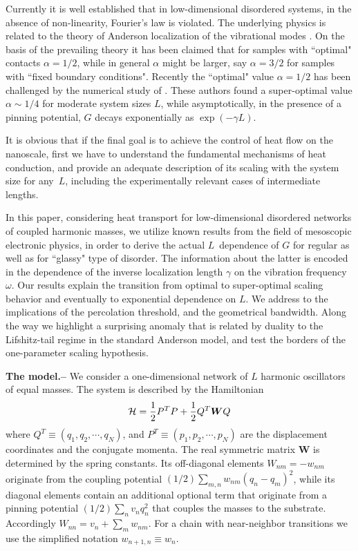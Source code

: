 \documentclass[twocolumn,showpacs,aps,pre]{revtex4-1}
\newcommand{\sect}[1]{{\bf #1.-- }}
\begin{document}
Currently it is well established that in low-dimensional disordered systems, in the absence of non-linearity, Fourier's law  is violated. The
underlying physics is related to the theory of Anderson localization of the vibrational modes \cite{D08,D01,LXXZL12,DL08,LD05,RD08,LZH01,
KCRDLS10a,KCRDLS10b}. On the basis of the prevailing theory \cite{D08,D01} it has been claimed that for samples with ``optimal" contacts ${\alpha=1/2}$, 
while in general $\alpha$ might be larger, say ${\alpha=3/2}$ for samples with ``fixed boundary conditions". Recently the ``optimal" value 
${\alpha=1/2}$ has been challenged by the numerical study of \cite{BZFK13}. These authors found a super-optimal value ${\alpha \sim 1/4}$ for 
moderate system sizes $L$, while asymptotically, in the presence of a pinning potential, $G$ decays exponentially as ${\exp(-\gamma L)}$. 



It is obvious that if the final goal 
is to achieve the control of heat flow on the nanoscale, 
first we have to understand the fundamental mechanisms of heat conduction, 
and provide an adequate description of its scaling with the system size for any~$L$, 
including the experimentally relevant cases of intermediate lengths.

In this paper, considering heat transport for low-dimensional disordered networks of coupled harmonic masses, we utilize known results from the field of mesoscopic electronic physics, in order to derive the actual $L$~dependence of $G$ for regular as well as for ``glassy" type of disorder. The information about the latter is encoded in the dependence of the inverse localization length $\gamma$ on the vibration frequency $\omega$. Our results explain the transition from optimal to super-optimal scaling behavior and eventually to exponential dependence on $L$. We address to the implications of the percolation threshold, and the geometrical bandwidth. Along the way we highlight a surprising anomaly that is related by duality to the Lifshitz-tail regime in the standard Anderson model, and test the borders of the one-parameter scaling hypothesis.  


\sect{The model}
%
We consider a one-dimensional network of $L$ harmonic oscillators of equal masses. 
The system is described by the Hamiltonian 
% 
\begin{equation}
{\cal H} = {1\over 2} P^T P + {1\over 2} Q^T \bm{W} Q 
\label{Hmatrix} 
\end{equation}
%
where $Q^T\equiv(q_1,q_2,\cdots,q_N)$, and $P^T\equiv(p_1,p_2,\cdots,p_N)$ 
are the displacement coordinates and the conjugate momenta. 
The real symmetric matrix  $\bm{W}$ is determined by the spring constants.
Its off-diagonal elements $W_{nm}{=}-w_{nm}$ originate from 
the coupling potential $(1/2)\sum_{m,n}w_{nm}(q_n-q_m)^2$, 
while its diagonal elements contain an additional 
optional term that originate from a pinning potential ${(1/2)\sum_n v_n q_n^2}$ 
that couples the masses to the substrate. 
Accordingly ${W_{nn}=v_n+\sum_m w_{nm}}$. 
For a chain with near-neighbor transitions we use 
the simplified notation ${w_{n{+}1,n} \equiv w_n}$.  
\end{document}

